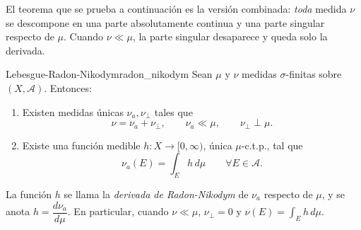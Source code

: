 \documentclass[11pt, a4paper]{article}
\begin{document}
El teorema que se prueba a continuación es la versión combinada: \emph{toda} medida $\nu$ se descompone en una
parte absolutamente continua y una parte singular respecto de $\mu$. Cuando $\nu \ll \mu$, la parte
singular desaparece y queda solo la derivada.

\begin{teorema}{Lebesgue-Radon-Nikodym}{radon_nikodym}
Sean $\mu$ y $\nu$ medidas $\sigma$-finitas sobre $(X, \mathcal{A})$. Entonces:
\begin{enumerate}
    \item Existen medidas únicas $\nu_a, \nu_\perp$ tales que
    $$ \nu = \nu_a + \nu_\perp, \qquad \nu_a \ll \mu, \qquad \nu_\perp \perp \mu. $$
    \item Existe una función medible $h: X \to [0, \infty)$, única $\mu$-c.t.p., tal que
    $$ \nu_a(E) = \int_E h \, d\mu \qquad \forall E \in \mathcal{A}. $$
\end{enumerate}
La función $h$ se llama la \emph{derivada de Radon-Nikodym} de $\nu_a$ respecto de $\mu$, y se
anota $h = \dfrac{d\nu_a}{d\mu}$. En particular, cuando $\nu \ll \mu$, $\nu_\perp = 0$ y
$\nu(E) = \int_E h \, d\mu$.
\end{teorema}
\end{document}
